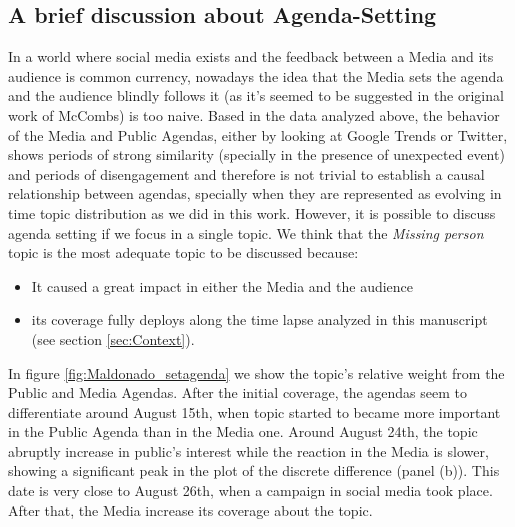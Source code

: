 \documentclass{bmcart}
\begin{document}
\subsection*{A brief discussion about  Agenda-Setting}
\label{sec:who_sets}

\par In a world where social media exists and the feedback between a Media and its audience is common currency, nowadays the idea that the Media sets the agenda and the audience blindly follows it (as it's seemed to be suggested in the original work of McCombs) is too naive. Based in the data analyzed above, the behavior of the Media  and Public Agendas, either by looking at Google Trends or Twitter, shows periods of strong similarity  (specially in the presence of unexpected event) and periods of disengagement and therefore is not trivial to establish a causal relationship between agendas, specially when they are represented as evolving in time topic distribution as we did in this work. However, it is possible to discuss agenda setting if we focus in a single topic. We think that the \emph{Missing person} topic is the most adequate topic to be discussed because:
\begin{itemize} 
\item It caused a great impact in either the Media and the audience
\item  its coverage fully deploys along the time lapse analyzed in this manuscript (see section \ref{sec:Context}).
\end{itemize}

\par In figure \ref{fig:Maldonado_setagenda} we show the topic's relative weight from the Public and Media Agendas.  After the initial coverage, the agendas seem to differentiate around August 15th, when topic started to became more important in the Public Agenda than in the Media one. Around August 24th, the topic abruptly increase in public's interest while the reaction in the Media is slower, showing a significant peak in the plot of the discrete difference (panel (b)). This date is very close to August 26th, when a campaign in social media took place. After that, the Media increase its coverage about the topic. 
\end{document}
